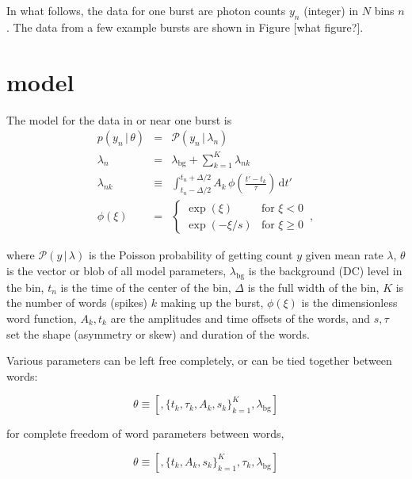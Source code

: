 \documentclass[12pt]{article}
\newcommand{\given}{\,|\,}
\newcommand{\dd}{\mathrm{d}}
\renewcommand{\count}{y}
\newcommand{\pars}{\theta}
\newcommand{\mean}{\lambda}
\newcommand{\Poisson}{{\mathcal P}}
\newcommand{\bg}{\mathrm{bg}}
\newcommand{\word}{\phi}
\begin{document}

In what follows, the data for one burst are photon counts $\count_n$ (integer) in $N$ bins $n$.
The data from a few example bursts are shown in Figure [what figure?].

\section{model}

The model for the data in or near one burst is
\begin{eqnarray}
p(\count_n\given\pars) &=& \Poisson(\count_n\given\mean_n)
\\
\mean_n &=& \mean_{\bg} + \sum_{k=1}^K \mean_{nk}
\\
\mean_{nk} &\equiv& \int_{t_n-\Delta/2}^{t_n+\Delta/2} A_k\,\word(\frac{t'-t_k}{\tau})\,\dd t'
\\
\word(\xi) &=& \left\{\begin{array}{ll}\exp(\xi) & \mbox{for $\xi<0$}\\ \exp(-\xi/s) & \mbox{for $\xi\geq 0$}\end{array}\right. \, ,
\end{eqnarray}

where $\Poisson(\count\given\mean)$ is the Poisson probability of getting count $y$ given mean rate $\mean$,
  $\pars$ is the vector or blob of all model parameters,
  $\mean_{\bg}$ is the background (DC) level in the bin,
  $t_n$ is the time of the center of the bin,
  $\Delta$ is the full width of the bin,
  $K$ is the number of words (spikes) $k$ making up the burst,
  $\phi(\xi)$ is the dimensionless word function,
  $A_k, t_k$ are the amplitudes and time offsets of the words,
  and $s, \tau$ set the shape (asymmetry or skew) and duration of the words.
  
Various parameters can be left free completely, or can be tied together between words:
 
\begin{equation}
\theta \equiv [,\{t_k, \tau_k, A_k, s_k \}_{k=1}^K, \mean_{\bg} ]
\end{equation}

for complete freedom of word parameters between words,

\begin{equation}
\theta \equiv [,\{t_k, A_k, s_k \}_{k=1}^K,  \tau_k, \mean_{\bg} ]
\end{equation}
\end{document}
